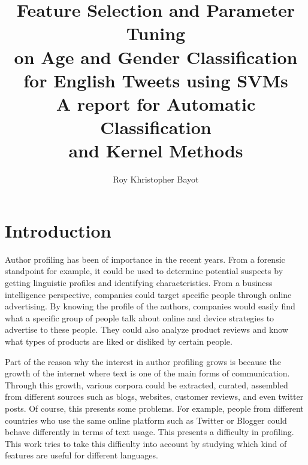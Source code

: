 \documentclass[a4paper]{llncs}
\begin{document}
\title{Feature Selection and Parameter Tuning\\
on Age and Gender Classification \\for English Tweets 
using SVMs\\
\large A report for Automatic Classification\\
and Kernel Methods}
\titlerunning{}
\author{Roy Khristopher Bayot}

\maketitle

\section{Introduction}
Author profiling has been of importance in the recent years. From a forensic standpoint for example, it could be used to determine potential suspects by getting linguistic profiles and identifying characteristics. From a business intelligence perspective, companies could target specific people through online advertising. By knowing the profile of the authors, companies would easily find what a specific group of people talk about online and device strategies to advertise to these people. They could also analyze product reviews and know what types of products are liked or disliked by certain people. 

Part of the reason why the interest in author profiling grows is because the growth of the internet where text is one of the main forms of communication. Through this growth, various corpora could be extracted, curated, assembled from different sources such as blogs, websites, customer reviews, and even twitter posts. Of course, this presents some problems. For example, people from different countries who use the same online platform such as Twitter or Blogger could behave differently in terms of text usage. This presents a difficulty in profiling. This work tries to take this difficulty into account by studying which kind of features are useful for different languages. 
\end{document}
